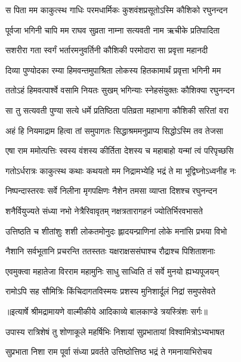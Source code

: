 \twolineshloka
{स पिता मम काकुत्स्थ गाधिः परमधार्मिकः}
{कुशवंशप्रसूतोऽस्मि कौशिको रघुनन्दन} %

\twolineshloka
{पूर्वजा भगिनी चापि मम राघव सुव्रता}
{नाम्ना सत्यवती नाम ऋचीके प्रतिपादिता} %

\twolineshloka
{सशरीरा गता स्वर्गं भर्तारमनुवर्तिनी}
{कौशिकी परमोदारा सा प्रवृत्ता महानदी} %

\twolineshloka
{दिव्या पुण्योदका रम्या हिमवन्तमुपाश्रिता}
{लोकस्य हितकामार्थं प्रवृत्ता भगिनी मम} %

\twolineshloka
{ततोऽहं हिमवत्पार्श्वे वसामि नियतः सुखम्}
{भगिन्याः स्नेहसंयुक्तः कौशिक्या रघुनन्दन} %

\twolineshloka
{सा तु सत्यवती पुण्या सत्ये धर्मे प्रतिष्ठिता}
{पतिव्रता महाभागा कौशिकी सरितां वरा} %

\twolineshloka
{अहं हि नियमाद्राम हित्वा तां समुपागतः}
{सिद्धाश्रममनुप्राप्य सिद्धोऽस्मि तव तेजसा} %

\twolineshloka
{एषा राम ममोत्पत्तिः स्वस्य वंशस्य कीर्तिता}
{देशस्य च महाबाहो यन्मां त्वं परिपृच्छसि} %

\twolineshloka
{गतोऽर्धरात्रः काकुत्स्थ कथाः कथयतो मम}
{निद्रामभ्येहि भद्रं ते मा भूद्विघ्नोऽध्वनीह नः} %

\twolineshloka
{निष्पन्दास्तरवः सर्वे निलीना मृगपक्षिणः}
{नैशेन तमसा व्याप्ता दिशश्च रघुनन्दन} %

\twolineshloka
{शनैर्वियुज्यते संध्या नभो नेत्रैरिवावृतम्}
{नक्षत्रतारागहनं ज्योतिर्भिरवभासते} %

\twolineshloka
{उत्तिष्ठति च शीतांशुः शशी लोकतमोनुदः}
{ह्लादयन्प्राणिनां लोके मनांसि प्रभया विभो} %

\twolineshloka
{नैशानि सर्वभूतानि प्रचरन्ति ततस्ततः}
{यक्षराक्षससंघाश्च रौद्राश्च पिशिताशनाः} %

\twolineshloka
{एवमुक्त्वा महातेजा विरराम महामुनिः}
{साधु साध्विति तं सर्वे मुनयो ह्यभ्यपूजयन्} %

\twolineshloka
{रामोऽपि सह सौमित्रिः किंचिदागतविस्मयः}
{प्रशस्य मुनिशार्दूलं निद्रां समुपसेवते} %


{॥इत्यार्षे श्रीमद्रामायणे वाल्मीकीये आदिकाव्ये बालकाण्डे त्रयस्त्रिंशः सर्गः॥}


\twolineshloka
{उपास्य रात्रिशेषं तु शोणाकूले महर्षिभिः}
{निशायां सुप्रभातायां विश्वामित्रोऽभ्यभाषत} %

\twolineshloka
{सुप्रभाता निशा राम पूर्वा संध्या प्रवर्तते}
{उत्तिष्ठोत्तिष्ठ भद्रं ते गमनायाभिरोचय} %

